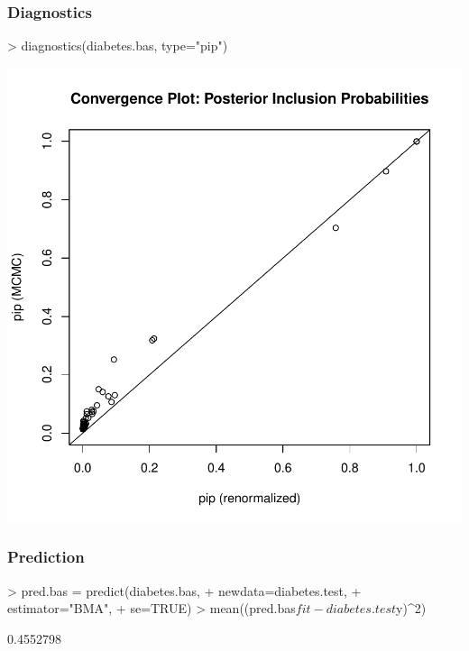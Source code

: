 \documentclass[]{beamer}
\begin{document}
\begin{frame}[fragile] \frametitle{Diagnostics}

\begin{Schunk}
\begin{Sinput}
> diagnostics(diabetes.bas, type="pip")
\end{Sinput}
\end{Schunk}
\includegraphics{16-prior-bma-diagnostics}

\end{frame}


\begin{frame}[fragile]\frametitle{Prediction}

\begin{Schunk}
\begin{Sinput}
> pred.bas = predict(diabetes.bas,
+                    newdata=diabetes.test,
+                    estimator="BMA",
+                    se=TRUE)
> mean((pred.bas$fit- diabetes.test$y)^2)
\end{Sinput}
\begin{Soutput}
[1] 0.4552798
\end{Soutput}
\end{Schunk}

\end{frame}
\end{document}
